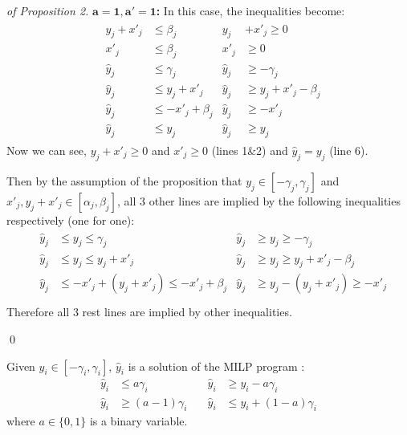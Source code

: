 \begin{proof}[of Proposition 2]
	
\textbf{$\mathbf{a = 1, a' = 1}$:} In this case, the inequalities become: \begin{align*}
	& \begin{aligned}
		y_j + x'_j &\leq \beta_j        &
		y_j &+ x'_j \geq 0 \\
		x'_j       &\leq \beta_j       & 
		x'_j       &\geq 0 \\
		\hat{y}_j  &\leq \gamma_j       &
		\hat{y}_j  &\geq -\gamma_j \\
		\hat{y}_j  &\leq y_j + x'_j  &
		\hat{y}_j  &\geq y_j + x'_j - \beta_j \\
		\hat{y}_j  &\leq -x'_j + \beta_j &
		\hat{y}_j  &\geq -x'_j \\
		\hat{y}_j  &\leq y_j &
		\hat{y}_j  &\geq y_j
	\end{aligned}
\end{align*} Now we can see, $y_j+x'_j\geq 0$ and $x'_j \geq 0$ (lines 1\&2) and $\hat{y}_j= y_j$ (line 6). 


Then by the assumption of the proposition that $y_j \in [-\gamma_j, \gamma_j]$ and $x'_j,y_j+x'_j \in [\alpha_j,\beta_j]$, all 3 other lines are implied by the following inequalities respectively (one for one):\begin{align*}
	& \begin{aligned}
		\hat{y}_j  &\leq y_j\leq \gamma_j       &
		\hat{y}_j  &\geq y_j\geq -\gamma_j \\
		\hat{y}_j  &\leq y_j \leq y_j + x'_j  &
		\hat{y}_j  &\geq y_j \geq y_j + x'_j - \beta_j \\
		\hat{y}_j  &\leq -x'_j+(y_j+x'_j)\leq -x'_j + \beta_j &
		\hat{y}_j  &\geq y_j - (y_j+x'_j)\geq -x'_j \\
	\end{aligned}
\end{align*}Therefore all 3 rest lines are implied by other inequalities.
	
	\qed
\end{proof}

  \begin{proposition}
	\label{prop3}
	Given $y_i \in [-\gamma_i,\gamma_i]$, 
	$\hat{y}_i$ is a solution of the MILP program :\begin{align*}
		\hat{y}_i &\leq a \gamma_i               &\quad \hat{y}_i &\geq y_i - a \gamma_i \\
		\hat{y}_i &\geq (a-1) \gamma_i           &\quad \hat{y}_i &\leq y_i + (1-a) \gamma_i
	\end{align*} where $a \in \{0,1\}$ is a binary variable.
\end{proposition}

